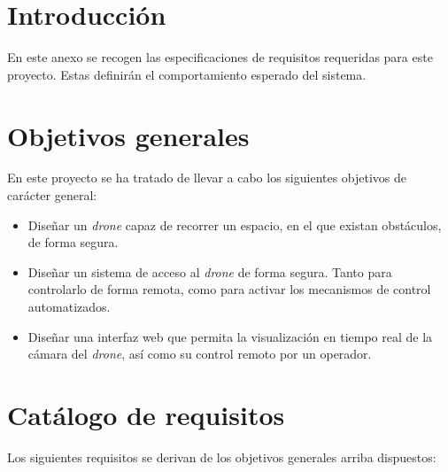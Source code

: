 
\section{Introducción}

En este anexo se recogen las especificaciones de requisitos requeridas para este proyecto. Estas definirán el comportamiento esperado del sistema. 

\section{Objetivos generales}

En este proyecto se ha tratado de llevar a cabo los siguientes objetivos de carácter general: 

\begin{itemize}
\item Diseñar un \emph{drone} capaz de recorrer un espacio, en el que existan obstáculos, de forma segura.
\item Diseñar un sistema de acceso al \emph{drone} de forma segura. Tanto para controlarlo de forma remota, como para activar los mecanismos de control automatizados.
\item Diseñar una interfaz web que permita la visualización en tiempo real de la cámara del \emph{drone}, así como su control remoto por un operador.
\end{itemize}


\section{Catálogo de requisitos}
Los siguientes requisitos se derivan de los objetivos generales arriba dispuestos: 

